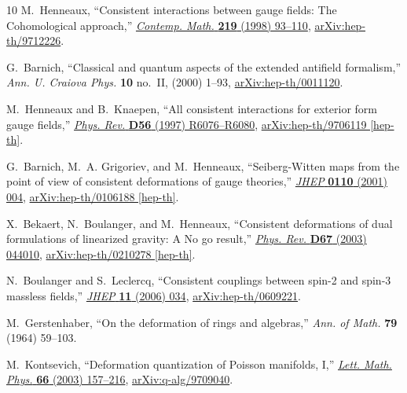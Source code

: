 \documentclass[a4paper,12pt]{article}
\numberwithin{equation}{section} %
\begin{document}
\begin{thebibliography}{10}
M.~Henneaux, ``{Consistent interactions between gauge fields: The Cohomological approach},'' \href{http://dx.doi.org/10.1090/conm/219/03070}{{\em Contemp. Math.} {\bfseries 219} (1998) 93--110}, \href{http://arxiv.org/abs/hep-th/9712226}{{\ttfamily arXiv:hep-th/9712226}}.

G.~Barnich, ``{Classical and quantum aspects of the extended antifield formalism},'' {\em Ann. U. Craiova Phys.} {\bfseries 10} no.~II, (2000) 1--93, \href{http://arxiv.org/abs/hep-th/0011120}{{\ttfamily arXiv:hep-th/0011120}}.

M.~Henneaux and B.~Knaepen, ``{All consistent interactions for exterior form gauge fields},'' \href{http://dx.doi.org/10.1103/PhysRevD.56.R6076}{{\em Phys. Rev.} {\bfseries D56} (1997) R6076--R6080},
\href{http://arxiv.org/abs/hep-th/9706119}{{\ttfamily arXiv:hep-th/9706119 [hep-th]}}.

G.~Barnich, M.~A. Grigoriev, and M.~Henneaux, ``{S}eiberg-{W}itten maps from the point of view of consistent deformations of gauge theories,'' \href{http://dx.doi.org/10.1088/1126-6708/2001/10/004}{{\em JHEP} {\bfseries 0110} (2001) 004},
\href{http://arxiv.org/abs/hep-th/0106188}{{\ttfamily arXiv:hep-th/0106188 [hep-th]}}.

X.~Bekaert, N.~Boulanger, and M.~Henneaux, ``{Consistent deformations of dual formulations of linearized gravity: A No go result},'' \href{http://dx.doi.org/10.1103/PhysRevD.67.044010}{{\em Phys. Rev.} {\bfseries D67} (2003) 044010},
\href{http://arxiv.org/abs/hep-th/0210278}{{\ttfamily arXiv:hep-th/0210278 [hep-th]}}.

N.~Boulanger and S.~Leclercq, ``{Consistent couplings between spin-2 and spin-3 massless fields},'' \href{http://dx.doi.org/10.1088/1126-6708/2006/11/034}{{\em JHEP} {\bfseries 11} (2006) 034}, \href{http://arxiv.org/abs/hep-th/0609221}{{\ttfamily arXiv:hep-th/0609221}}.

M.~Gerstenhaber, ``{O}n the deformation of rings and algebras,'' {\em Ann. of Math.} {\bfseries 79} (1964) 59--103.

M.~Kontsevich, ``{D}eformation quantization of {P}oisson manifolds, {I},'' \href{http://dx.doi.org/10.1023/B:MATH.0000027508.00421.bf}{{\em Lett. Math. Phys.} {\bfseries 66} (2003) 157--216},
\href{http://arxiv.org/abs/q-alg/9709040}{{\ttfamily arXiv:q-alg/9709040}}.


\end{thebibliography}
\end{document}
